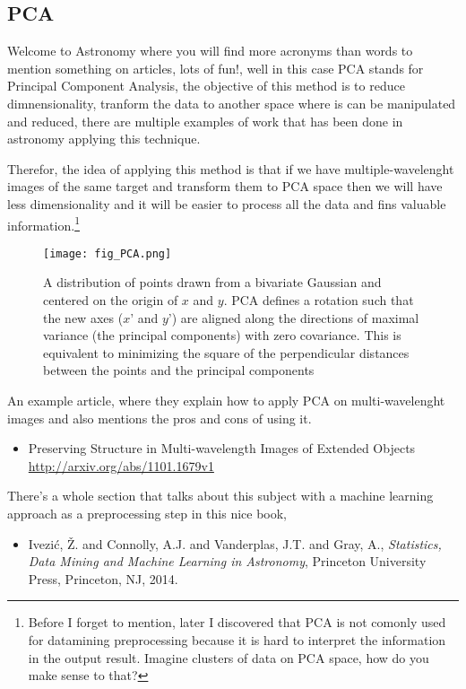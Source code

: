 \documentclass[11pt,fleqn]{book} %
\begin{document}
\subsection{PCA}

Welcome to Astronomy where you will find more acronyms than words to mention something on articles, lots of fun!, well in this case PCA stands for Principal Component Analysis, the objective of this method is to reduce dimnensionality, tranform the data to another space where is can be manipulated and reduced, there are multiple examples of work that has been done in astronomy applying this technique.

Therefor, the idea of applying this method is that if we have multiple-wavelenght images of the same target and transform them to PCA space then we will have less dimensionality and it will be easier to process all the data and fins valuable information.\footnote{Before I forget to mention, later I discovered that PCA is not comonly used for datamining preprocessing because it is hard to interpret the information in the output result. Imagine clusters of data on PCA space, how do you make sense to that?}

\begin{figure}[h]
    \centering
    \texttt{[image: fig\_PCA.png]}
    \caption{A distribution of points drawn from a bivariate Gaussian and centered on the origin of $x$ and $y$. PCA defines a rotation such that the new axes ($x’$ and $y’$) are aligned along the directions of maximal variance (the principal components) with zero covariance. This is equivalent to minimizing the square of the perpendicular distances between the points and the principal components}
    \label{fig:pca}
\end{figure}

\begin{remark}
	An example article, where they explain how to apply PCA on multi-wavelenght images and also mentions the pros and cons of using it.
    \begin{itemize}
    	\item Preserving Structure in Multi-wavelength Images of Extended Objects\\ \url{http://arxiv.org/abs/1101.1679v1}
    \end{itemize}
    There's a whole section that talks about this subject with a machine learning approach as a preprocessing step in this nice book,
    \begin{itemize}
    	\item Ivezi{\'c}, \v Z. and Connolly, A.J.
         and Vanderplas, J.T. and Gray, A., \textit{Statistics, Data Mining and Machine Learning in Astronomy}, Princeton University Press, Princeton, NJ, 2014.
    \end{itemize}
\end{remark}
\end{document}
